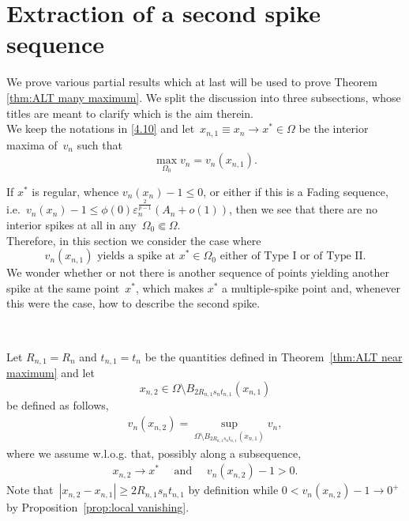 \documentclass[10pt]{amsart}
\newcommand{\eps}{\varepsilon}
\renewcommand{\to}{\rightarrow}
\begin{document}
   \bigskip


\section{Extraction of a second spike sequence}\label{sec5}
We prove various partial results which at last will be used to prove Theorem \ref{thm:ALT many maximum}. We split the discussion into three
subsections, whose titles are meant to clarify which is the aim therein.\\

    We keep the notations in \eqref{4.10} and let~$x_{n,1}\equiv x_n\to x^*\in \Omega$ be the interior maxima of~$v_n$ such that
    $$\max\limits_{\Omega_0} v_n = v_n(x_{n,1}).$$

    If $x^*$ is regular, whence $v_n(x_n)-1\leq 0$, or either if this is a Fading sequence,
    i.e.~$v_n(x_n)-1 \leq \phi(0)\eps_n^{\frac{2}{p-1}}(A_n+o(1))$,
    then we see that there are no interior spikes at all in any~$\Omega_0\Subset\Omega$.\\
    Therefore, in this section we consider the case where
    \begin{equation}\label{Htype}
    v_n(x_{n,1}) \mbox{ yields a spike at } x^*\in \Omega_0 \mbox{ either of Type I or of Type II}.
    \end{equation}
    We wonder whether or not there is another sequence of points yielding another spike at the same point~$x^*$,
    which makes $x^*$ a multiple-spike point and, whenever this were the case, how to describe the second spike.

    \

    Let $R_{n,1}=R_n$ and $t_{n,1}=t_n$ be the quantities defined in Theorem~\ref{thm:ALT near maximum} and
    let $$x_{n,2}\in \Omega\setminus B_{2R_{n,1} s_n t_{n,1}}(x_{n,1})$$ be defined as follows,
    \begin{align*}
     v_n(x_{n,2})=\sup_{\Omega\setminus B_{2R_{n,1} s_n t_{n,1}}(x_{n,1})} v_n,
    \end{align*}
    where we assume w.l.o.g. that, possibly along a subsequence,
    \begin{align}\label{Hypxn2}
       x_{n,2}\to x^* \quad \mbox{ and }\quad   v_n(x_{n,2})-1>0.
    \end{align}
    Note that~$|x_{n,2}-x_{n,1}|\geq 2 R_{n,1}s_n t_{n,1}$ by definition while $0<v_n(x_{n,2})-1\to 0^+$ by Proposition~\ref{prop:local vanishing}.
\end{document}
